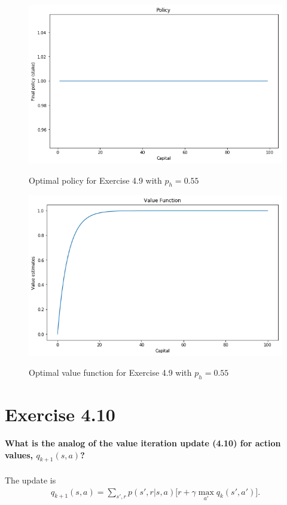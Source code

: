 \documentclass[a4paper,11pt]{article}
\numberwithin{equation}{section}
\theoremstyle{remark}
\begin{document}
\begin{figure}
	\centering
	\caption{Optimal policy for Exercise 4.9 with $p_h = 0.55$}
	\includegraphics[scale=0.75]{policy_4_9_ph_55.png}
	\label{fig:policy_4_9_ph_55}
\end{figure}

\begin{figure}
	\centering
	\caption{Optimal value function for Exercise 4.9 with $p_h = 0.55$}
	\includegraphics[scale=0.75]{value_4_9_ph_55.png}
	\label{fig:value_4_9_ph_55}
\end{figure}



\section{Exercise 4.10}

\textbf{What is the analog of the value iteration update (4.10) for action values, $q_{k+1}(s, a)$?}
\\ \\
The update is
\begin{align*}
	q_{k+1}(s, a) = \sum_{s', r} p(s', r | s, a) \Big [r + \gamma \max_{a'} q_{k}(s', a') \Big].
\end{align*}
\end{document}
